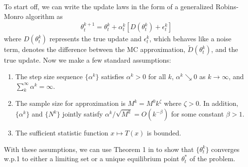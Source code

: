 \documentclass[twoside,11pt]{article}
\begin{document}
To start off, we can write the update laws in the form of a generalized Robins-Monro algorithm as
\begin{align}
\label{eq:robin_monro}
\theta^{k+1}_t = \theta^k_t + \alpha^k_t[D(\theta^k_t) + \epsilon^k_t]
\end{align}
where $D(\theta_t^k)$ represents the true update and $\epsilon_t^k$, which behaves like a noise term, denotes the difference between the \ac{MC} approximation, $\tilde{D}(\theta_t^k)$, and the true update. Now we make a few standard assumptions:
\begin{assumption}\label{assump: convergence}
\begin{enumerate}[label=(\alph*)]
    \item The step size sequence $\{\alpha^k\}$ satisfies $\alpha^k>0$ for all $k$, $\alpha^k \searrow 0$ as $k\rightarrow \infty$, and $\sum_k^\infty \alpha^k = \infty$.
    \item The sample size for approximation is $M^k = M^0 k^\zeta$ where $\zeta > 0$. In addition, $\{\alpha^k\}$ and $\{N^k\}$ jointly satisfy $\alpha^k/\sqrt{M^k} = O(k^{-\beta})$ for some constant $\beta > 1$.
    \item The sufficient statistic function $x\mapsto T(x)$ is bounded.
\end{enumerate}
\end{assumption}

With these assumptions, we can use Theorem 1 in \cite{zhou2014gradient} to show that $\{\theta_t^k\}$ converges w.p.1 to either a limiting set or a unique equilibrium point $\theta_t^*$ of the problem.
\end{document}
